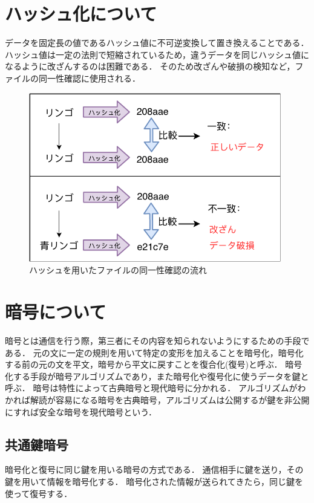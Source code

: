 \documentclass[a4j,12pt]{jsarticle}
\begin{document}
\newpage
\section{ハッシュ化について}

データを固定長の値であるハッシュ値に不可逆変換して置き換えることである．
ハッシュ値は一定の法則で短縮されているため，違うデータを同じハッシュ値になるように改ざんするのは困難である．
そのため改ざんや破損の検知など，ファイルの同一性確認に使用される．\\

\begin{figure}[H]
\centering
\includegraphics[width=11cm]{hash.pdf}
\caption{ハッシュを用いたファイルの同一性確認の流れ}
\label{fig:no}
\end{figure} 



\newpage
\section{暗号について}
暗号とは通信を行う際，第三者にその内容を知られないようにするための手段である．
元の文に一定の規則を用いて特定の変形を加えることを暗号化，暗号化する前の元の文を平文，暗号から平文に戻すことを復合化(復号)と呼ぶ．
暗号化する手段が暗号アルゴリズムであり，また暗号化や復号化に使うデータを鍵と呼ぶ．
暗号は特性によって古典暗号と現代暗号に分かれる．
アルゴリズムがわかれば解読が容易になる暗号を古典暗号，アルゴリズムは公開するが鍵を非公開にすれば安全な暗号を現代暗号という．

\subsection{共通鍵暗号}
暗号化と復号に同じ鍵を用いる暗号の方式である．
通信相手に鍵を送り，その鍵を用いて情報を暗号化する．
暗号化された情報が送られてきたら，同じ鍵を使って復号する．
\end{document}
